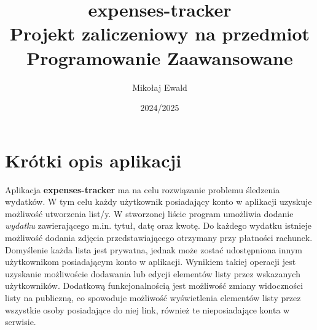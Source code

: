 \documentclass{article}
\title{%
    \textbf{expenses-tracker} \\
    \large Projekt zaliczeniowy na przedmiot Programowanie Zaawansowane
}
\author{Mikołaj Ewald}
\date{2024/2025}
\begin{document}
   
   \maketitle
   
   \noindent\makebox[\linewidth]{\rule{\columnwidth}{0.4pt}}
   
   \section*{Krótki opis aplikacji}
    Aplikacja \textbf{expenses-tracker} ma na celu rozwiązanie problemu śledzenia wydatków. W tym celu każdy użytkownik
    posiadający konto w aplikacji uzyskuje możliwość utworzenia list/y. W stworzonej liście program umożliwia dodanie
    \textit{wydatku} zawierającego m.in. tytuł, datę oraz kwotę. Do każdego wydatku istnieje możliwość dodania zdjęcia
    przedstawiającego otrzymany przy płatności rachunek. \\
    Domyślenie każda lista jest prywatna, jednak może zostać udostępniona innym użytkownikom posiadającym konto w 
    aplikacji. Wynikiem takiej operacji jest uzyskanie możliwoście dodawania lub edycji elementów listy przez wskazanych
    użytkowników. Dodatkową funkcjonalnością jest możliwość zmiany widoczności listy na publiczną, co spowoduje 
    możliwość wyświetlenia elementów listy przez wszystkie osoby posiadające do niej link, również te nieposiadające 
    konta w serwisie.
    
\end{document}
